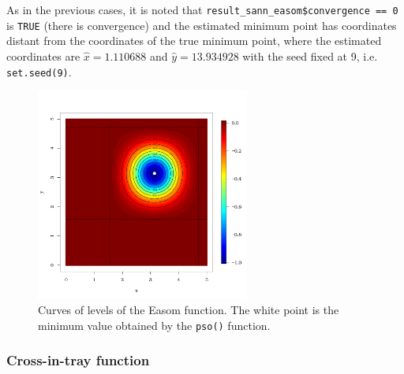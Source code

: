\documentclass[10pt,letterpaper]{article}
\begin{document}
As in the previous cases, it is noted that \texttt{result\_sann\_easom\$convergence == 0} is \texttt{TRUE} (there is convergence) and the estimated minimum point has coordinates distant from the coordinates of the true minimum point, where the estimated coordinates are $\hat{x}=1.110688$ and $\hat{y}=13.934928$
with the seed fixed at 9, i.e. \texttt{set.seed(9)}.
\begin{figure}[H]
\centering
\includegraphics[width=7cm,height=7cm]{curve_easom}
\caption{Curves of levels of the Easom function. The white point is the minimum value obtained by the \texttt{pso()} function.}
\label{curves_easom}
\end{figure}

\subsubsection{Cross-in-tray function}
\end{document}
